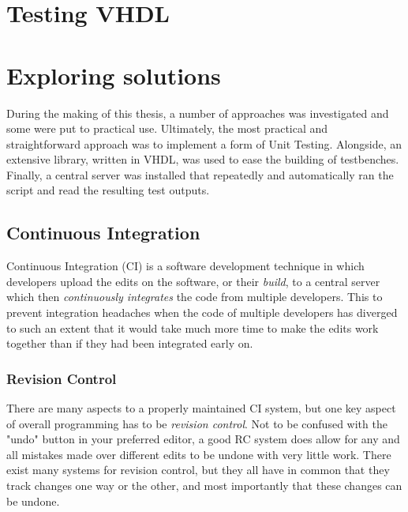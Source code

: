 \documentclass[11pt,british]{article}
\begin{document}
\section{Testing VHDL}

\newpage

\section{Exploring solutions}
During the making of this thesis, a number of approaches was investigated and some were put to practical use. Ultimately, the most practical and straightforward approach was to implement a form of Unit Testing. Alongside, an extensive library, written in VHDL, was used to ease the building of testbenches. Finally, a central server was installed that repeatedly and automatically ran the script and read the resulting test outputs.

\subsection{Continuous Integration}
Continuous Integration (CI) is a software development technique in which developers upload the edits on the software, or their \emph{build}, to a central server which then \emph{continuously integrates} the code from multiple developers. This to prevent integration headaches when the code of multiple developers has diverged to such an extent that it would take much more time to make the edits work together than if they had been integrated early on.

\subsubsection{Revision Control}
There are many aspects to a properly maintained CI system, but one key aspect of overall programming has to be \emph{revision control}. Not to be confused with the "undo" button in your preferred editor, a good RC system does allow for any and all mistakes made over different edits to be undone with very little work. There exist many systems for revision control, but they all have in common that they track changes one way or the other, and most importantly that these changes can be undone. 
\end{document}
